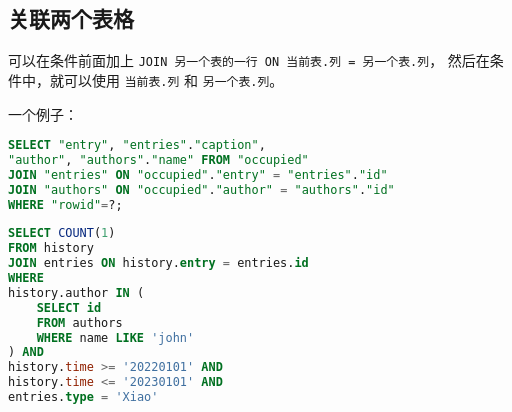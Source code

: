 \subsection{关联两个表格}
可以在条件前面加上 \verb|JOIN 另一个表的一行 ON 当前表.列 = 另一个表.列|， 然后在条件中，就可以使用 \verb|当前表.列| 和 \verb|另一个表.列|。

一个例子：
\begin{lstlisting}[language=sql]
SELECT "entry", "entries"."caption",
"author", "authors"."name" FROM "occupied"
JOIN "entries" ON "occupied"."entry" = "entries"."id"
JOIN "authors" ON "occupied"."author" = "authors"."id"
WHERE "rowid"=?;
\end{lstlisting}

\begin{lstlisting}[language=sql,caption=stat.sh]
SELECT COUNT(1) 
FROM history 
JOIN entries ON history.entry = entries.id 
WHERE 
history.author IN ( 
    SELECT id 
    FROM authors 
    WHERE name LIKE 'john' 
) AND 
history.time >= '20220101' AND 
history.time <= '20230101' AND 
entries.type = 'Xiao'
\end{lstlisting}
